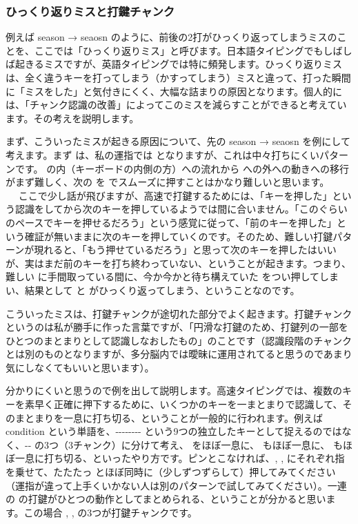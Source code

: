 \subsubsection*{ひっくり返りミスと打鍵チャンク}

例えば season → seaosn のように、前後の2打がひっくり返ってしまうミスのことを、ここでは「ひっくり返りミス」と呼びます。日本語タイピングでもしばしば起きるミスですが、英語タイピングでは特に頻発します。ひっくり返りミスは、全く違うキーを打ってしまう（かすってしまう）ミスと違って、打った瞬間に「ミスをした」と気付きにくく、大幅な詰まりの原因となります。個人的には、「チャンク認識の改善」によってこのミスを減らすことができると考えています。その考えを説明します。

まず、こういったミスが起きる原因について、先の season → seaosn を例にして考えます。まず  は、私の運指では  となりますが、これは中々打ちにくいパターンです。 の内（キーボードの内側の方）への流れから  への外への動きへの移行がまず難しく、次の  を  でスムーズに押すことはかなり難しいと思います。
      　
ここで少し話が飛びますが、高速で打鍵するためには、「キーを押した」という認識をしてから次のキーを押しているようでは間に合いません。「このぐらいのペースでキーを押せるだろう」という感覚に従って、「前のキーを押した」という確証が無いままに次のキーを押していくのです。そのため、難しい打鍵パターンが現れると、「もう押せているだろう」と思って次のキーを押したはいいが、実はまだ前のキーを打ち終わっていない、ということが起きます。つまり、難しい  に手間取っている間に、今か今かと待ち構えていた  をつい押してしまい、結果として  と  がひっくり返ってしまう、ということなのです。

こういったミスは、打鍵チャンクが途切れた部分でよく起きます。打鍵チャンクというのは私が勝手に作った言葉ですが、「円滑な打鍵のため、打鍵列の一部をひとつのまとまりとして認識しなおしたもの」のことです（認識段階のチャンクとは別のものとなりますが、多分脳内では曖昧に運用されてると思うのであまり気にしなくてもいいと思います）。

分かりにくいと思うので例を出して説明します。高速タイピングでは、複数のキーを素早く正確に押下するために、いくつかのキーを一まとまりで認識して、そのまとまりを一息に打ち切る、ということが一般的に行われます。例えば condition という単語を、--------  という9つの独立したキーとして捉えるのではなく、--  の3つ（3チャンク）に分けて考え、 をほぼ一息に、 もほぼ一息に、 もほぼ一息に打ち切る、といったやり方です。ピンとこなければ、, ,  にそれぞれ指を乗せて、たたたっ とほぼ同時に（少しずつずらして）押してみてください（運指が違って上手くいかない人は別のパターンで試してみてください）。一連の  の打鍵がひとつの動作としてまとめられる、ということが分かると思います。この場合 , ,  の3つが打鍵チャンクです。

